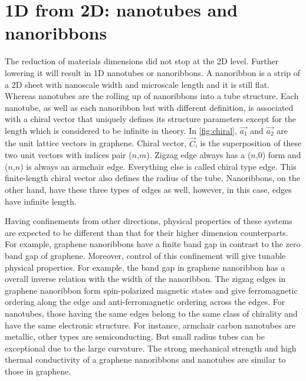 \section{1D from 2D: nanotubes and nanoribbons}

The reduction of materials dimensions did not stop at the 2D level. Further lowering it will result in 1D nanotubes or nanoribbons. A nanoribbon is a strip of a 2D sheet with nanoscale width and microscale length and it is still flat. Whereas nanotubes are the rolling up of nanoribbons into a tube structure. Each nanotube, as well as each nanoribbon but with different definition, is associated with a chiral vector that uniquely defines its structure parameters except for the length which is considered to be infinite in theory. In \autoref{fig:chiral}, $\vec{a_1} $ and $\vec{a_2}$ are the unit lattice vectors in graphene. Chiral vector, $\vec{C}$, is the superposition of these two unit vectors with indices pair ($n$,$m$). Zigzag edge always has a ($n$,0) form and ($n$,$n$) is always an armchair edge. Everything else is called chiral type edge.  This finite-length chiral vector also defines the radius of the tube. Nanoribbons, on the other hand, have these three types of edges as well, however, in this case, edges have infinite length.

Having confinements from other directions, physical properties of these systems are expected to be different than that for their higher dimension counterparts. For example, graphene nanoribbons have a finite band gap in contrast to the zero band gap of graphene\cite{Wang2008}. Moreover, control of this confinement will give tunable physical properties. For example, the band gap in graphene nanoribbon has a overall inverse relation with the width of the nanoribbon\cite{Han2007}. The zigzag edges in graphene nanoribbon form spin-polarized magnetic states and give ferromagnetic ordering along the edge and anti-ferromagnetic ordering across the edges\cite{Son2006}. For nanotubes, those having the same edges belong to the same class of chirality and have the same electronic structure. For instance, armchair carbon nanotubes are metallic, other types are semiconducting. But small radius tubes can be exceptional due to the large curvature\cite{Bandaru2007}.  The strong mechanical strength and high thermal conductivity of a graphene nanoribbons and nanotubes are similar to those in graphene.

